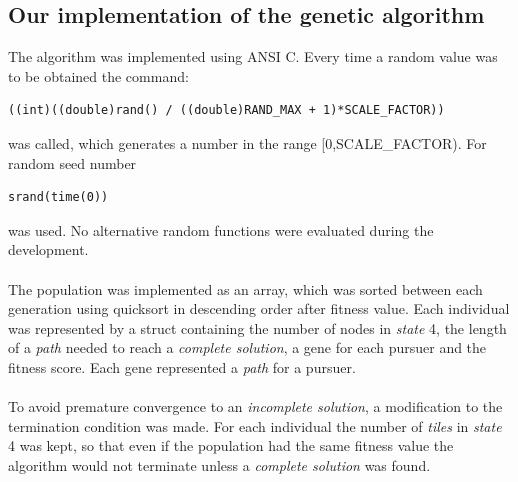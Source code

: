 \subsection{Our implementation of the genetic algorithm}
The algorithm was implemented using ANSI C. Every time a random value was to be obtained the command:
\begin{verbatim}
((int)((double)rand() / ((double)RAND_MAX + 1)*SCALE_FACTOR))
\end{verbatim}
was called, which generates a number in the range [0,SCALE\_FACTOR). For random seed number
\begin{verbatim}
srand(time(0))
\end{verbatim}
was used. No alternative random functions were evaluated during the development.\\\\
The population was implemented as an array, which was sorted between each generation using quicksort \cite{quicksort} in descending order after fitness value. Each individual was represented by a struct containing the number of nodes in \emph{state} 4, the length of a \emph{path} needed to reach a \emph{complete solution}, a gene for each pursuer and the fitness score. Each gene represented a \emph{path} for a pursuer.\\\\
%
To avoid premature convergence to an \emph{incomplete solution}, a modification to the termination condition was made. For each individual the number of \emph{tiles} in \emph{state} 4 was kept, so that even if the population had the same fitness value the algorithm would not terminate unless a \emph{complete solution} was found.
\newpage